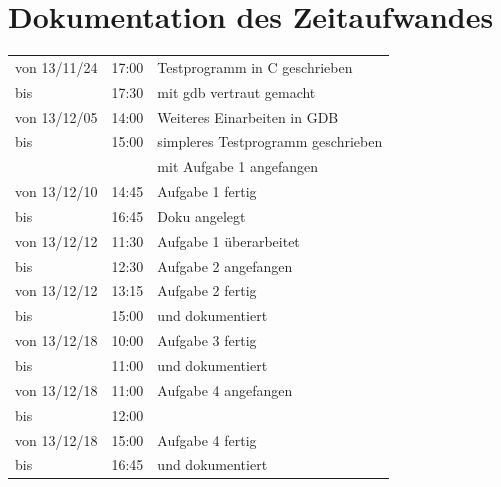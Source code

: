 \documentclass[11pt,a4paper]{article}
\begin{document}
\section{Dokumentation des Zeitaufwandes}
\begin{tabular}{ l c | l }
von 13/11/24 & 17:00 & Testprogramm in C geschrieben \\
bis & 17:30 & mit gdb vertraut gemacht \\
\hline
von 13/12/05 & 14:00 & Weiteres Einarbeiten in GDB \\
bis & 15:00 & simpleres Testprogramm geschrieben \\
&&mit Aufgabe 1 angefangen \\
\hline
von 13/12/10 & 14:45 & Aufgabe 1 fertig \\
bis & 16:45 & Doku angelegt \\
\hline
von 13/12/12 & 11:30 & Aufgabe 1 überarbeitet \\
bis & 12:30 & Aufgabe 2 angefangen \\
\hline
von 13/12/12 & 13:15 & Aufgabe 2 fertig \\
bis & 15:00 & und dokumentiert \\
\hline
von 13/12/18 & 10:00 & Aufgabe 3 fertig \\
bis & 11:00 & und dokumentiert \\
\hline
von 13/12/18 & 11:00 & Aufgabe 4 angefangen \\
bis & 12:00 & \\
\hline
von 13/12/18 & 15:00 & Aufgabe 4 fertig \\
bis & 16:45 & und dokumentiert \\
\hline
\end{tabular}
\end{document}
